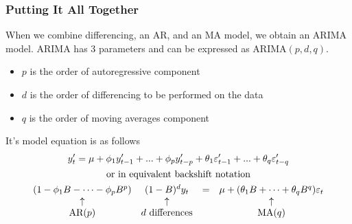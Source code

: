 \documentclass{article}
\begin{document}
  \subsubsection{Putting It All Together}
  When we combine differencing, an AR, and an MA model, we obtain an ARIMA model. ARIMA has 3 parameters and can be expressed as ARIMA$(p,d,q)$.
  \begin{itemize}
    \item $p$ is the order of autoregressive component
    \item $d$ is the order of differencing to be performed on the data
    \item $q$ is the order of moving averages component
  \end{itemize}
  It's model equation is as follows
  \begin{gather*}
    y_t' = \mu + \phi_1 y_{t-1}' + ... + \phi_p y_{t-p}' + \theta_1 \varepsilon_{t-1}' + ... + \theta_q \varepsilon_{t-q}'\\
    \text{or in equivalent backshift notation}\\
    \begin{array}{c c c c}
      (1-\phi_1B - \cdots - \phi_p B^p) & (1-B)^d y_{t} &= &\mu + (\theta_1 B + \cdots + \theta_q B^q)\varepsilon_t\\
      {\uparrow} & {\uparrow} & &{\uparrow}\\
      \text{AR($p$)} & \text{$d$ differences} & & \text{MA($q$)}\\
    \end{array}
  \end{gather*}
\end{document}
